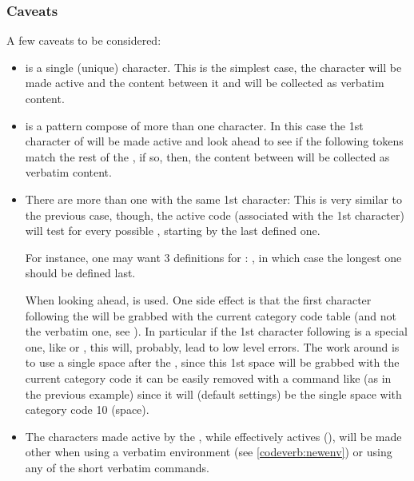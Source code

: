\documentclass[10pt]{article}
\begin{document}
\subsubsection{Caveats}\label{codeverb:caveats}
A few caveats to be considered:
\begin{itemize}
  \item {} is a single (unique) character. This is the simplest case, the   character will be made active and the content between it and  will be collected as verbatim content.
  \item {} is a pattern compose of more than one character. In this case the 1st character of  will be made active and look ahead to see if the following tokens match the rest of the , if so, then, the content between  will be collected as verbatim content.
  \item There are more than one  with the same 1st character: This is very similar to the previous case, though, the active code (associated with the 1st character) will test for every possible , starting by the last defined one.
      \begin{tsremark}
        For instance, one may want 3 definitions for : \tsobj{|,||,|||}, in which case the longest one should be defined last.
      \end{tsremark}
      \begin{tsremark}
        When looking ahead,  is used. One side effect is that the first character following the  will be grabbed with the current category code table (and not the verbatim one, see ). In particular if the 1st character following  is a special one, like \tsverb[verb]{ \ } or \tsfmt[verb]{\#}, this will, probably, lead to low level errors. The work around is to use a single space after the , since this 1st space will be grabbed with the current category code it can be easily removed with a command like  (as in the previous example) since it will (default settings) be the single space with category code 10 (space).
      \end{tsremark}
  \item The characters made active by the , while effectively actives (\tsobj{\cvSVerbOn}), will be made other when using a verbatim environment (see \ref{codeverb:newenv}) or using any of the short verbatim commands.
\end{itemize}
\end{document}

